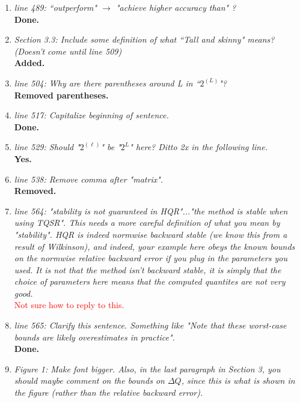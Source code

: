 \documentclass[final,onefignum,onetabnum]{siamart190516}
\newcommand{\red}[1]{\textcolor{red}{#1}}
\begin{document}
\begin{enumerate}
	\item {\it line 489: ``outperform" $\rightarrow$ "achieve higher accuracy than" ?}\\
	{\bf Done.}
	
	\item {\it Section 3.3: Include some definition of what ``Tall and skinny" means? (Doesn't come until line 509)}\\
	{\bf Added.}
	
	\item {\it line 504: Why are there parentheses around L in ``$2^{(L)}$"?}\\
	{\bf Removed parentheses.}
	
	\item {\it line 517: Capitalize beginning of sentence.}\\
	{\bf Done.}
	
	\item {\it line 529: Should "$2^{(\ell)}$" be "$2^L$" here? Ditto 2x in the following line. }\\
	{\bf Yes.}
	
	\item {\it line 538: Remove comma after "matrix".}\\
	{\bf Removed.}
	
	\item {\it line 564: "stability is not guaranteed in HQR"..."the method is stable when using TQSR". This needs a more careful definition of what you mean by "stability". HQR is indeed normwise backward stable (we know this from a result of Wilkinson), and indeed, your example here obeys the known bounds on the normwise relative backward error if you plug in the parameters you used. It is not that the method isn't backward stable, it is simply that the choice of parameters here means that the computed quantites are not very good. }\\
	\red{ Not sure how to reply to this. }
	
	
	\item {\it line 565: Clarify this sentence. Something like "Note that these worst-case bounds are likely overestimates in practice".}\\
	{\bf Done.}
	
	\item {\it Figure 1: Make font bigger. Also, in the last paragraph in Section 3, you should maybe comment on the bounds on $\Delta Q$, since this is what is shown in the figure (rather than the relative backward error). }\\
	{\bf }
	

\end{enumerate}
\end{document}
